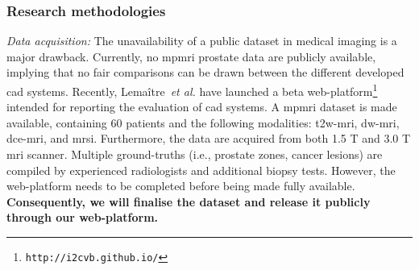 
\subsubsection{Research methodologies}
\label{sec:methodologies}

\emph{Data acquisition:}
The unavailability of a public dataset in medical imaging is a major drawback.
Currently, no \ac{mpmri} prostate data are publicly available, implying that no fair comparisons can be drawn between the different developed \ac{cad} systems.
Recently, Lema\^itre~\emph{et al.} have launched a beta web-platform\footnote{\texttt{http://i2cvb.github.io/}} intended for reporting the evaluation of \ac{cad} systems.
A \ac{mpmri} dataset is made available, containing 60 patients and the following modalities: \ac{t2w}-\ac{mri}, \ac{dw}-\ac{mri}, \ac{dce}-\ac{mri}, and \ac{mrsi}.
Furthermore, the data are acquired from both 1.5 T and 3.0 T \ac{mri} scanner.
Multiple ground-truths (i.e., prostate zones, cancer lesions) are compiled by experienced radiologists and additional biopsy tests.
However, the web-platform needs to be completed before being made fully available.
\textbf{Consequently, we will finalise the dataset and release it publicly through our web-platform.}

